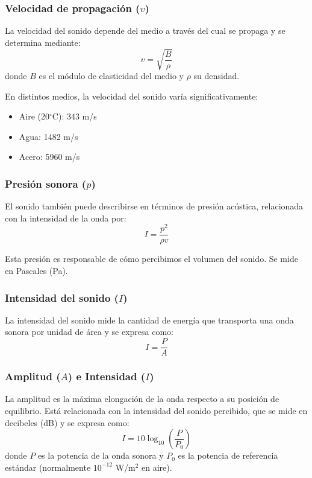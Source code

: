 \subsubsection{Velocidad de propagación ($v$)}
La velocidad del sonido depende del medio a través del cual se propaga y se determina mediante:
\begin{equation}
    v = \sqrt{\frac{B}{\rho}}
\end{equation}
donde $B$ es el módulo de elasticidad del medio y $\rho$ su densidad.

En distintos medios, la velocidad del sonido varía significativamente:
\begin{itemize}
    \item Aire (20$^\circ$C): 343 m/s
    \item Agua: 1482 m/s
    \item Acero: 5960 m/s
\end{itemize}

\subsubsection{Presión sonora ($p$)}
El sonido también puede describirse en términos de presión acústica, relacionada con la intensidad de la onda por:
\begin{equation}
    I = \frac{p^2}{\rho v}
\end{equation}

Esta presión es responsable de cómo percibimos el volumen del sonido. Se mide en Pascales (Pa).

\subsubsection{Intensidad del sonido ($I$)}
La intensidad del sonido mide la cantidad de energía que transporta una onda sonora por unidad de área y se expresa como:
\begin{equation}
    I = \frac{P}{A}
\end{equation}

\subsubsection{Amplitud ($A$) e Intensidad ($I$)}
La amplitud es la máxima elongación de la onda respecto a su posición de equilibrio. Está relacionada con la intensidad del sonido percibido, que se mide en decibeles (dB) y se expresa como:
\begin{equation}
    I = 10 \log_{10} \left( \frac{P}{P_0} \right)
\end{equation}
donde $P$ es la potencia de la onda sonora y $P_0$ es la potencia de referencia estándar (normalmente $10^{-12}$ W/m$^2$ en aire).


